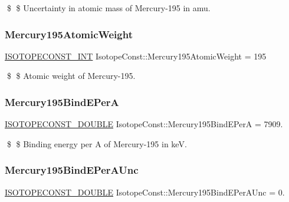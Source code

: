 \$ \$ Uncertainty in atomic mass of Mercury-\/195 in amu. \mbox{\label{group___isotope_const-_mercury-_hg195_ga7f76500f8556338650de80630d381737}} 
\subsubsection{\texorpdfstring{Mercury195\+Atomic\+Weight}{Mercury195AtomicWeight}}
{\footnotesize\ttfamily \mbox{\hyperlink{group___isotope_const-_macros_ga5f18360b3e99483a35c32d789e62621c}{I\+S\+O\+T\+O\+P\+E\+C\+O\+N\+S\+T\+\_\+\+I\+NT}} Isotope\+Const\+::\+Mercury195\+Atomic\+Weight = 195}

\$ \$ Atomic weight of Mercury-\/195. \mbox{\label{group___isotope_const-_mercury-_hg195_ga35f8cbe6f8c52e2ff7ea9680227ac3f7}} 
\subsubsection{\texorpdfstring{Mercury195\+Bind\+E\+PerA}{Mercury195BindEPerA}}
{\footnotesize\ttfamily \mbox{\hyperlink{group___isotope_const-_macros_ga8f45a7272ce02c0b4c65c44636ed719a}{I\+S\+O\+T\+O\+P\+E\+C\+O\+N\+S\+T\+\_\+\+D\+O\+U\+B\+LE}} Isotope\+Const\+::\+Mercury195\+Bind\+E\+PerA = 7909.}

\$ \$ Binding energy per A of Mercury-\/195 in keV. \mbox{\label{group___isotope_const-_mercury-_hg195_ga58ff4982d36a7af78138fa138e42ce85}} 
\subsubsection{\texorpdfstring{Mercury195\+Bind\+E\+Per\+A\+Unc}{Mercury195BindEPerAUnc}}
{\footnotesize\ttfamily \mbox{\hyperlink{group___isotope_const-_macros_ga8f45a7272ce02c0b4c65c44636ed719a}{I\+S\+O\+T\+O\+P\+E\+C\+O\+N\+S\+T\+\_\+\+D\+O\+U\+B\+LE}} Isotope\+Const\+::\+Mercury195\+Bind\+E\+Per\+A\+Unc = 0.}

